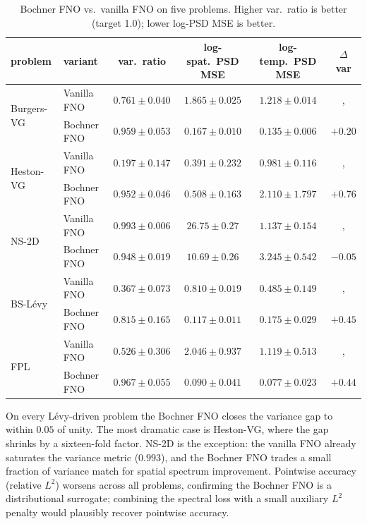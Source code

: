 \documentclass[review,12pt]{elsarticle}
\begin{document}
\begin{table}[h]
\centering
\caption{Bochner FNO vs.\ vanilla FNO on five problems. Higher
var.\ ratio is better (target 1.0); lower log-PSD MSE is better.}
\label{tab:spectral-fno}
\begin{tabular}{l l c c c c}
\toprule
problem & variant & var.\ ratio & log-spat.\ PSD MSE & log-temp.\ PSD MSE & $\Delta$ var \\
\midrule
\multirow{2}{*}{Burgers-VG} &
 Vanilla FNO & $0.761 \pm 0.040$ & $1.865 \pm 0.025$ & $1.218 \pm 0.014$ &, \\
& Bochner FNO & $\mathbf{0.959 \pm 0.053}$ & $\mathbf{0.167 \pm 0.010}$ & $\mathbf{0.135 \pm 0.006}$ & $+0.20$ \\
\midrule
\multirow{2}{*}{Heston-VG} &
 Vanilla FNO & $0.197 \pm 0.147$ & $0.391 \pm 0.232$ & $0.981 \pm 0.116$ &, \\
& Bochner FNO & $\mathbf{0.952 \pm 0.046}$ & $0.508 \pm 0.163$ & $2.110 \pm 1.797$ & $\mathbf{+0.76}$ \\
\midrule
\multirow{2}{*}{NS-2D}   &
 Vanilla FNO & $\mathbf{0.993 \pm 0.006}$ & $26.75 \pm 0.27$ & $1.137 \pm 0.154$ &, \\
& Bochner FNO & $0.948 \pm 0.019$ & $\mathbf{10.69 \pm 0.26}$ & $3.245 \pm 0.542$ & $-0.05$ \\
\midrule
\multirow{2}{*}{BS-L\'evy} &
 Vanilla FNO & $0.367 \pm 0.073$ & $0.810 \pm 0.019$ & $0.485 \pm 0.149$ &, \\
& Bochner FNO & $\mathbf{0.815 \pm 0.165}$ & $\mathbf{0.117 \pm 0.011}$ & $\mathbf{0.175 \pm 0.029}$ & $+0.45$ \\
\midrule
\multirow{2}{*}{FPL}    &
 Vanilla FNO & $0.526 \pm 0.306$ & $2.046 \pm 0.937$ & $1.119 \pm 0.513$ &, \\
& Bochner FNO & $\mathbf{0.967 \pm 0.055}$ & $\mathbf{0.090 \pm 0.041}$ & $\mathbf{0.077 \pm 0.023}$ & $+0.44$ \\
\bottomrule
\end{tabular}
\end{table}

On every L\'evy-driven problem the Bochner FNO closes the
variance gap to within $0.05$ of unity. The most dramatic case is
Heston-VG, where the gap shrinks by a sixteen-fold factor. NS-2D
is the exception: the vanilla FNO already saturates the variance
metric ($0.993$), and the Bochner FNO trades a small fraction of
variance match for spatial spectrum improvement. Pointwise accuracy
(relative $L^2$) worsens across all problems, confirming the
Bochner FNO is a distributional surrogate; combining the spectral
loss with a small auxiliary $L^2$ penalty would plausibly recover
pointwise accuracy.
\end{document}
